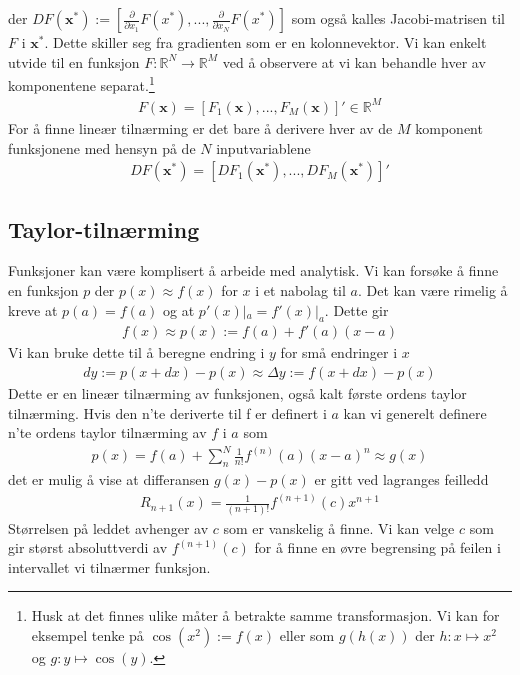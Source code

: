 der $DF(\mathbf{x}^*) := \left[\frac{\partial}{\partial x_1}F(x^*), ... ,\frac{\partial}{\partial x_N}F(x^*) \right]$ som også kalles Jacobi-matrisen til $F$ i $\mathbf{x}^*$. Dette skiller seg fra gradienten som er en kolonnevektor. Vi kan enkelt utvide til en funksjon $F: \mathbb{R}^N \to \mathbb{R}^M$ ved å observere at vi kan behandle hver av komponentene separat.\footnote{Husk at det finnes ulike måter å betrakte samme transformasjon. Vi kan for eksempel tenke på $\cos(x^2) := f(x)$ eller som $g(h(x))$ der $h:x\mapsto x^2$ og $g:y\mapsto \cos(y)$.}
\begin{align}
F(\mathbf{x}) = \left[F_1(\mathbf{x}),...,F_M(\mathbf{x})\right]' \in \mathbb{R}^M
\end{align}
For å finne lineær tilnærming er det bare å derivere hver av de $M$ komponent funksjonene med hensyn på de $N$ inputvariablene
\begin{align}
DF(\mathbf{x}^*) = \left[DF_1(\mathbf{x}^*),...,DF_M(\mathbf{x}^*)\right]'
\end{align}
\subsection{Taylor-tilnærming}
Funksjoner kan være komplisert å arbeide med analytisk. Vi kan forsøke å finne en funksjon $p$ der $p(x) \approx f(x)$ for $x$ i et nabolag til $a$. Det kan være rimelig å kreve at $p(a) = f(a)$ og at $p'(x)|_a = f'(x)|_a$. Dette gir
\begin{align}
f(x) \approx p(x) := f(a)+f'(a)(x-a)
\end{align}
Vi kan bruke dette til å beregne endring i $y$ for små endringer i $x$
\begin{align}
dy := p(x+dx)-p(x) \approx \Delta y := f(x+dx)-p(x)
\end{align}
Dette er en lineær tilnærming av funksjonen, også kalt første ordens taylor tilnærming. Hvis den n'te deriverte til f er definert i $a$ kan vi generelt definere n'te ordens taylor tilnærming av $f$ i $a$ som
\begin{align}
p(x) = f(a) + \sum_n^N \frac{1}{n!}f^(n)(a)(x-a)^n \approx g(x)
\end{align}
det er mulig å vise at differansen $g(x)-p(x)$ er gitt ved lagranges feilledd
\begin{align}
R_{n+1}(x)=\frac{1}{(n+1)!}f^{(n+1)}(c)x^{n+1}
\end{align}
Størrelsen på leddet avhenger av $c$ som er vanskelig å finne. Vi kan velge $c$ som gir størst absoluttverdi av $f^{(n+1)}(c)$ for å finne en øvre begrensing på feilen i intervallet vi tilnærmer funksjon.
